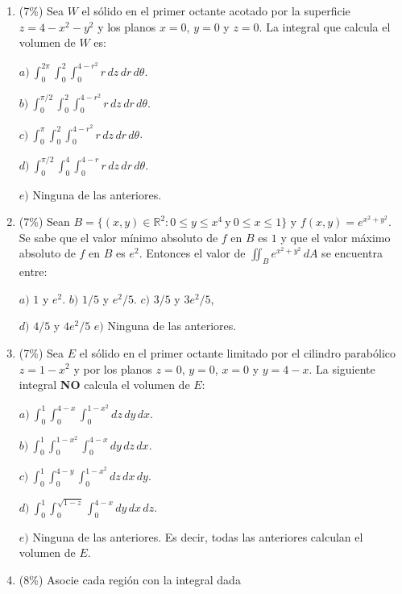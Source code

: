 \documentclass[11pt]{article}
\begin{document}
\begin{enumerate}
\begin{enumerate}
\item{} (7\%) Sea $W$ el sólido en el primer octante acotado por la superficie $z=4-x^2-y^2$ y los planos $x=0$, $y=0$ y $z=0$. La integral que calcula el volumen de $W$ es:

\vspace{4pt}
\noindent $a)\ \int_0^{2\pi}\int_0^2\int_0^{4-r^2} r\,dz\,dr\,d\theta$.

\noindent $b)\ \int_0^{\pi/2}\int_0^2\int_0^{4-r^2} r\,dz\,dr\,d\theta$.

\noindent $c)\ \int_0^{\pi}\int_0^2\int_0^{4-r^2} r\,dz\,dr\,d\theta$.

\noindent $d)\ \int_0^{\pi/2}\int_0^4\int_0^{4-r} r\,dz\,dr\,d\theta$.

\noindent $e)$ Ninguna de las anteriores.

\item{} (7\%) Sean $B=\{(x,y)\in\mathbb{R}^2: 0\leq y\leq x^4\ \text{y}\ 0\leq x\leq 1\}$ y $f(x,y)=e^{x^2+y^2}$. Se sabe que el valor mínimo absoluto de $f$ en $B$ es $1$ y que el valor máximo absoluto de $f$ en $B$ es $e^2$. Entonces el valor de $\iint_B e^{x^2+y^2}\,dA$ se encuentra entre:

\vspace{4pt}
\noindent $a)$ $1$ y $e^2$. \hspace{1cm} $b)$ $1/5$ y $e^2/5$. \hspace{1cm} $c)$ $3/5$ y $3e^2/5$,

\noindent $d)$ $4/5$ y $4e^2/5$ \hspace{1cm} $e)$ Ninguna de las anteriores.

\item{} (7\%) Sea $E$ el sólido en el primer octante limitado por el cilindro parabólico $z=1-x^2$ y por los planos $z=0$, $y=0$, $x=0$ y $y=4-x$. La siguiente integral \textbf{NO} calcula el volumen de $E$:

\vspace{4pt}
\noindent $a)\ \int_0^1\int_0^{4-x}\int_0^{1-x^2}dz\,dy\,dx.$

\noindent $b)\ \int_0^1\int_0^{1-x^2}\int_0^{4-x}dy\,dz\,dx.$

\noindent $c)\ \int_0^1\int_0^{4-y}\int_0^{1-x^2}dz\,dx\,dy.$

\noindent $d)\ \int_0^1\int_0^{\sqrt{1-z}}\int_0^{4-x}dy\,dx\,dz.$

\noindent $e)$ Ninguna de las anteriores. Es decir, todas las anteriores calculan el volumen de $E$.

\item{} (8\%) Asocie cada región con la integral dada


\end{enumerate}
\end{enumerate}
\end{document}
